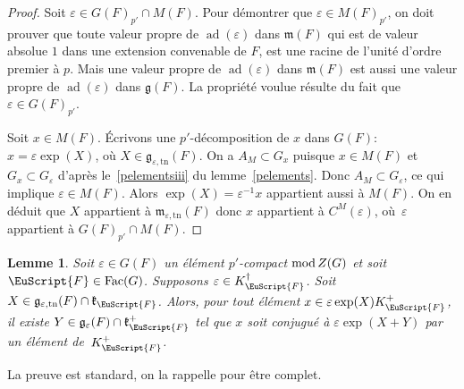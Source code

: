 \documentclass[JEP,XML,SOM,Unicode,francais]{cedram}
\let\mathcal \EuScript
\let\epsilon\varepsilon
\newcommand{\rmod}{\textup{mod}\,}
\newcommand{\frg}{\mathfrak{g}}
\newcommand{\frk}{\mathfrak{k}}
\newcommand{\mfrm}{\mathfrak{m}}
\newcommand{\Fac}{\mathrm{Fac}}
\newcommand{\tn}{\mathrm{tn}}
\DeclareMathOperator{\ad}{ad}
\newcommand{\cF}{\mathcal{F}}
\theoremstyle{plain}
\newtheorem*{lem*}{Lemme}
\theoremstyle{definition}
\begin{document}
\begin{proof}
Soit $\epsilon\in G(F)_{p'}\cap M(F)$. Pour démontrer que $\epsilon\in M(F)_{p'}$, on doit prouver que toute valeur propre de $\ad(\epsilon)$ dans $\mfrm(F)$ qui est de valeur absolue $1$ dans une extension convenable de $F$, est une racine de l'unité d'ordre premier à $p$. Mais une valeur propre de $\ad(\epsilon)$ dans $\mfrm(F)$ est aussi une valeur propre de $\ad(\epsilon)$ dans $\frg(F)$. La propriété voulue résulte du fait que $\epsilon\in G(F)_{p'}$.

Soit $x\in M(F)$.
Écrivons une $p'$-décomposition de $x$ dans $G(F)$: $x=\epsilon \exp(X)$, où $X\in \frg_{\epsilon,\tn}(F)$.
On a $A_{M}\subset G_{x} $ puisque $x\in M(F)$ et $G_{x}\subset G_{\epsilon}$ d'après le~\eqref{pelementsiii} du lemme~\ref{pelements}. Donc $A_{M}\subset G_{\epsilon}$, ce qui implique $\epsilon\in M(F)$. Alors $\exp(X)=\epsilon^{-1}x$ appartient aussi à $M(F)$. On en déduit que $X$ appartient à $\mfrm_{\epsilon,\tn}(F)$ donc $x$ appartient à $C^M(\epsilon)$, où~$\epsilon$ appartient à $G(F)_{p'}\cap M(F)$.
\end{proof}

\label{commutant}

\begin{lem*}
Soit $\epsilon\in G(F)$ un élément $p'$-compact $\rmod Z(G)$ et soit $\cF\in \Fac(G)$. Supposons $\epsilon\in K_{\cF}^{\dag}$. Soit $X\in \frg_{\epsilon,\tn}(F)\cap \frk_{\cF}$. Alors, pour tout élément $x\in \epsilon \exp(X) K_{\cF}^+$, il existe $Y\in \frg_{\epsilon}(F)\cap \frk_{\cF}^+$ tel que $x$ soit conjugué à $\epsilon \exp(X+Y)$ par un élément de~$K_{\cF}^+$.
\end{lem*}

La preuve est standard, on la rappelle pour être complet.
\end{document}
